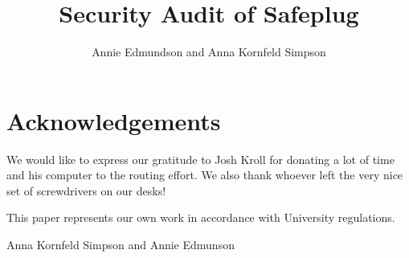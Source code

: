 \documentclass[12pt, letterpaper]{article}
\title{Security Audit of Safeplug}
\author{Annie Edmundson and Anna Kornfeld Simpson}
\begin{document}
\maketitle









\section{Acknowledgements}
We would like to express our gratitude to Josh Kroll for donating a lot of time and his computer to the routing effort.  We also thank whoever left the very nice set of screwdrivers on our desks!

This paper represents our own work in accordance with University regulations.

Anna Kornfeld Simpson and Annie Edmunson


\end{document}
